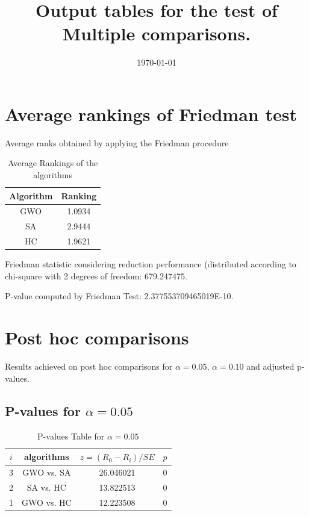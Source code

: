 \documentclass[a4paper,10pt]{article}
\title{Output tables for the test of Multiple comparisons.}
\author{}
\date{\today}
\begin{document}
\begin{landscape}
\pagestyle{empty}
\maketitle
\thispagestyle{empty}
\section{Average rankings of Friedman test}



Average ranks obtained by applying the Friedman procedure

\begin{table}[!htp]
\centering
\begin{tabular}{|c|c|}\hline
Algorithm&Ranking\\\hline
GWO & 1.0934\\
SA & 2.9444\\
HC & 1.9621\\
\hline
\end{tabular}
\caption{Average Rankings of the algorithms}
\end{table}

Friedman statistic considering reduction performance (distributed according to chi-square with 2 degrees of freedom: 679.247475.

P-value computed by Friedman Test: 2.377553709465019E-10.\newline



\pagebreak

\section{Post hoc comparisons}

Results achieved on post hoc comparisons for $\alpha = 0.05$, $\alpha = 0.10$ and adjusted p-values.

\subsection{P-values for $\alpha=0.05$}

\begin{table}[!htp]
\centering\scriptsize
\begin{tabular}{cccc}
$i$&algorithms&$z=(R_0 - R_i)/SE$&$p$\\
\hline3&GWO vs. SA&26.046021&0\\
2&SA vs. HC&13.822513&0\\
1&GWO vs. HC&12.223508&0\\
\hline
\end{tabular}
\caption{P-values Table for $\alpha=0.05$}
\end{table}\pagebreak


\end{landscape}
\end{document}
